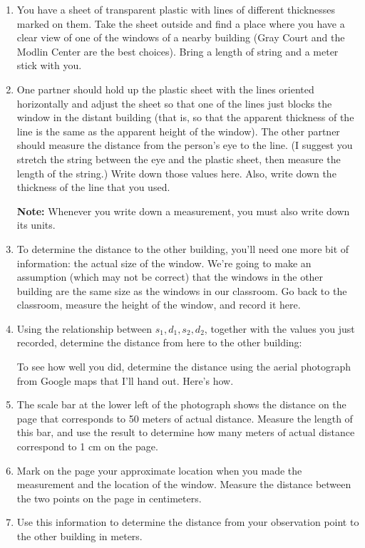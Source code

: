\begin{enumerate}

\item You have a sheet of transparent plastic with lines of different
thicknesses marked on them.  Take the sheet outside and find a place
where you have a clear view of one of the windows of a nearby 
building (Gray Court and the Modlin Center are the best choices).  Bring
a length of string and a meter stick with you.

\item One partner should hold up the plastic sheet with the lines
oriented horizontally and adjust the sheet so that one of the lines just
blocks the window in the distant
building (that is, so that the apparent thickness
of the line is the same as the apparent height of the window).
The other partner should measure the distance from the person's eye to
the line.  (I suggest you stretch the string between the eye and
the plastic sheet, then measure the length of the string.)
Write down those values here.  Also, write down the thickness of the
line that you used.

{\bf Note:} Whenever you write down a measurement,
you must also write down its units.

\vskip 1in

\item To determine the distance to the other building, you'll need one more bit
of information: the actual size of the window.  We're going to make
an assumption (which may not be correct) that the windows in the other
building
are the same size as the windows in our classroom.  Go back
to the classroom, measure the height of the window, and record it here.

\vskip 1in

\item Using the relationship between $s_1,d_1,s_2,d_2$, together
with the values you just recorded, determine the distance
from here to the other building:

\vskip 1in

To see how well you did, determine the distance using
the
aerial photograph from Google maps
that I'll hand out. Here's how.

\item The scale bar at the lower left of the photograph
shows the distance on the page that corresponds to 50 meters of
actual distance. Measure the length of this bar, and use the result
to determine how many meters of actual distance correspond to 1 cm
on the page.

\vskip 1in

\item Mark on the page your approximate location when you made the
measurement and the location of the window. Measure the distance between
the two points on the page in centimeters.

\vskip 1in 

\item Use this information to determine the distance from your
observation point to the other building in meters.

\vskip 1in

\end{enumerate}

